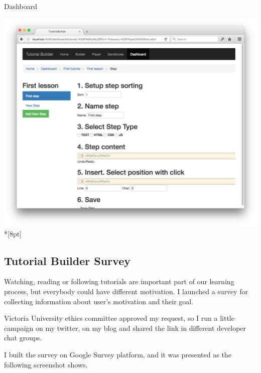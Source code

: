 \documentclass[12pt, a4paper, oneside, openright, medskipamount]{report}
\begin{document}
Dashboard

\includegraphics[width=1\textwidth]{assets/tour-screenshots/dashboard.png}\\*[8pt]

\subsection{Tutorial Builder Survey}

Watching, reading or following tutorials are important part of our learning process, but everybody could have different motivation. I launched a survey for collecting information about user's motivation and their goal.

Victoria University ethics committee approved my request, so I run a little campaign on my twitter, on my blog and shared the link in different developer chat groups.

I built the survey on Google Survey platform, and it was presented as the following screenshot shows.
\end{document}
